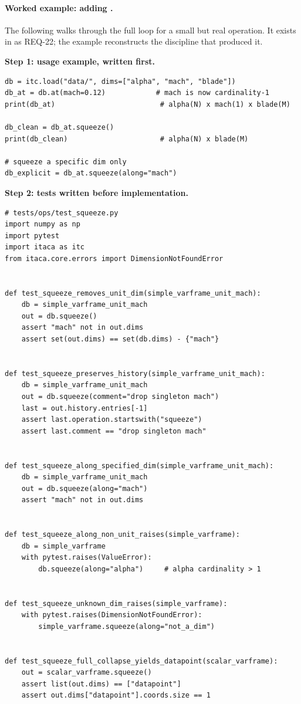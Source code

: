 \paragraph{Worked example: adding .}

The following walks through the full loop for a small but real
operation. It exists in \itc{} as REQ-22; the example reconstructs the
discipline that produced it.

\textbf{Step 1: usage example, written first.}
\begin{lstlisting}
db = itc.load("data/", dims=["alpha", "mach", "blade"])
db_at = db.at(mach=0.12)            # mach is now cardinality-1
print(db_at)                         # alpha(N) x mach(1) x blade(M)

db_clean = db_at.squeeze()
print(db_clean)                      # alpha(N) x blade(M)

# squeeze a specific dim only
db_explicit = db_at.squeeze(along="mach")
\end{lstlisting}

\textbf{Step 2: tests written before implementation.}
\begin{lstlisting}
# tests/ops/test_squeeze.py
import numpy as np
import pytest
import itaca as itc
from itaca.core.errors import DimensionNotFoundError


def test_squeeze_removes_unit_dim(simple_varframe_unit_mach):
    db = simple_varframe_unit_mach
    out = db.squeeze()
    assert "mach" not in out.dims
    assert set(out.dims) == set(db.dims) - {"mach"}


def test_squeeze_preserves_history(simple_varframe_unit_mach):
    db = simple_varframe_unit_mach
    out = db.squeeze(comment="drop singleton mach")
    last = out.history.entries[-1]
    assert last.operation.startswith("squeeze")
    assert last.comment == "drop singleton mach"


def test_squeeze_along_specified_dim(simple_varframe_unit_mach):
    db = simple_varframe_unit_mach
    out = db.squeeze(along="mach")
    assert "mach" not in out.dims


def test_squeeze_along_non_unit_raises(simple_varframe):
    db = simple_varframe
    with pytest.raises(ValueError):
        db.squeeze(along="alpha")     # alpha cardinality > 1


def test_squeeze_unknown_dim_raises(simple_varframe):
    with pytest.raises(DimensionNotFoundError):
        simple_varframe.squeeze(along="not_a_dim")


def test_squeeze_full_collapse_yields_datapoint(scalar_varframe):
    out = scalar_varframe.squeeze()
    assert list(out.dims) == ["datapoint"]
    assert out.dims["datapoint"].coords.size == 1
\end{lstlisting}

